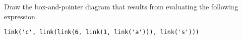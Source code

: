 \begin{blocksection}
\question Draw the box-and-pointer diagram that results from evaluating the following expression.

\begin{lstlisting}
link('c', link(link(6, link(1, link('a'))), link('s')))
\end{lstlisting}
\end{blocksection}